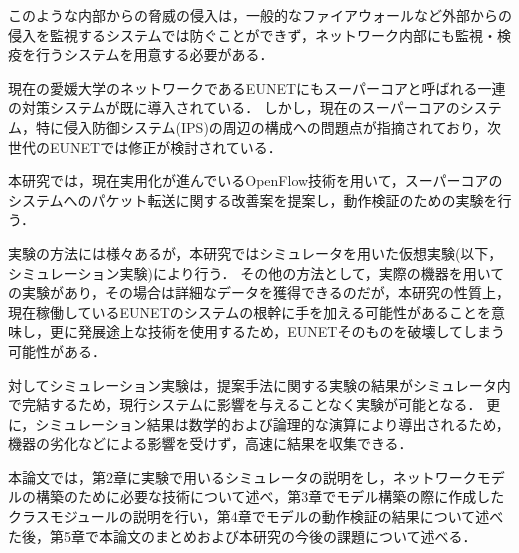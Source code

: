 このような内部からの脅威の侵入は，一般的なファイアウォールなど外部からの侵入を監視するシステムでは防ぐことができず，ネットワーク内部にも監視・検疫を行うシステムを用意する必要がある．

現在の愛媛大学のネットワークであるEUNETにもスーパーコアと呼ばれる一連の対策システムが既に導入されている．
しかし，現在のスーパーコアのシステム，特に侵入防御システム(IPS)の周辺の構成への問題点が指摘されており，次世代のEUNETでは修正が検討されている．

本研究では，現在実用化が進んでいるOpenFlow技術を用いて，スーパーコアのシステムへのパケット転送に関する改善案を提案し，動作検証のための実験を行う．

実験の方法には様々あるが，本研究ではシミュレータを用いた仮想実験(以下，シミュレーション実験)により行う．
その他の方法として，実際の機器を用いての実験があり，その場合は詳細なデータを獲得できるのだが，本研究の性質上，現在稼働しているEUNETのシステムの根幹に手を加える可能性があることを意味し，更に発展途上な技術を使用するため，EUNETそのものを破壊してしまう可能性がある．

対してシミュレーション実験は，提案手法に関する実験の結果がシミュレータ内で完結するため，現行システムに影響を与えることなく実験が可能となる．
更に，シミュレーション結果は数学的および論理的な演算により導出されるため，機器の劣化などによる影響を受けず，高速に結果を収集できる．

本論文では，第2章に実験で用いるシミュレータの説明をし，ネットワークモデルの構築のために必要な技術について述べ，第3章でモデル構築の際に作成したクラスモジュールの説明を行い，第4章でモデルの動作検証の結果について述べた後，第5章で本論文のまとめおよび本研究の今後の課題について述べる．